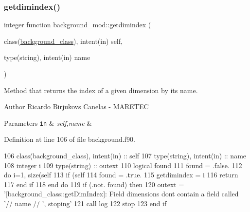 \subsubsection{\texorpdfstring{getdimindex()}{getdimindex()}}
{\footnotesize\ttfamily integer function background\+\_\+mod\+::getdimindex (\begin{DoxyParamCaption}\item[{class(\mbox{\hyperlink{structbackground__mod_1_1background__class}{background\+\_\+class}}), intent(in)}]{self,  }\item[{type(string), intent(in)}]{name }\end{DoxyParamCaption})\hspace{0.3cm}{\ttfamily [private]}}



Method that returns the index of a given dimension by it\textquotesingle{}s name. 

\begin{DoxyAuthor}{Author}
Ricardo Birjukovs Canelas -\/ M\+A\+R\+E\+T\+EC 
\end{DoxyAuthor}

\begin{DoxyParams}[1]{Parameters}
\mbox{\tt in}  & {\em self,name} & \\
\hline
\end{DoxyParams}


Definition at line 106 of file background.\+f90.


\begin{DoxyCode}
106     \textcolor{keywordtype}{class}(background\_class), \textcolor{keywordtype}{intent(in)} :: self
107     \textcolor{keywordtype}{type}(string), \textcolor{keywordtype}{intent(in)} :: name
108     \textcolor{keywordtype}{integer} i
109     \textcolor{keywordtype}{type}(string) :: outext
110     \textcolor{keywordtype}{logical} found
111     found = .false.
112     \textcolor{keywordflow}{do} i=1, \textcolor{keyword}{size}(self%
113         \textcolor{keywordflow}{if} (self%
114             found = .true.
115             getdimindex = i
116             \textcolor{keywordflow}{return}
117 \textcolor{keywordflow}{        end if}
118 \textcolor{keywordflow}{    end do}
119     \textcolor{keywordflow}{if} (.not. found) \textcolor{keywordflow}{then}
120         outext = \textcolor{stringliteral}{'[background\_class::getDimIndex]: Field dimensions dont contain a field called '}// name //\textcolor{stringliteral}{
      ', stoping'}
121         \textcolor{keyword}{call }log%
122         stop
123 \textcolor{keywordflow}{    end if}    
\end{DoxyCode}
\mbox{\label{namespacebackground__mod_acdcc52b4fb298bc145a121f9e8a4b929}} 
